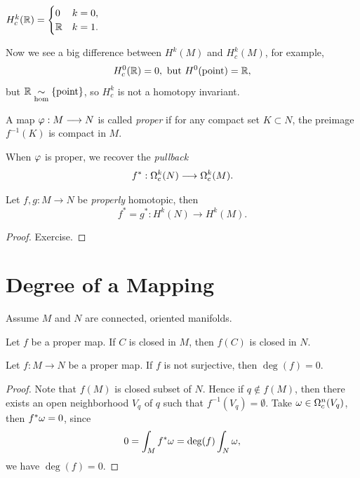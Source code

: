 \begin{example}
    \(H_c^k(\mathbb{R}) = \begin{cases}
        0 & k = 0, \\
        \mathbb{R} & k = 1.
    \end{cases}\)
\end{example}

Now we see a big difference between \(H^k(M)\) and \(H_c^k(M)\), for example, \[
    H_c^0(\mathbb{R}) = 0, \text{ but } H^0({\text{point}}) = \mathbb{R},
\] but \(\mathbb{R}\underset{\mathrm{hom}}{\sim} \{\text{point}\}\), so \(H_c^k\) is not a homotopy invariant.

\begin{definition}
    A map \(\varphi:M\longrightarrow N\) is called \emph{proper} if for any compact set \(K\subset N\), the preimage \(f^{-1}(K)\) is compact in \(M\).
\end{definition}
When \(\varphi\) is proper, we recover the \emph{pullback} \[
    f^*:\Omega_c^k(N)\longrightarrow\Omega_c^k(M).
\]

\begin{theorem}
    Let \(f,g:M\longrightarrow N\) be \emph{properly} homotopic, then \[
        f^* = g^*:H^k(N)\longrightarrow H^k(M).
    \]
\end{theorem}
\begin{proof}
    Exercise.
\end{proof}

\begin{theorem}
    
\end{theorem}

\section{Degree of a Mapping}

Assume \(M\) and \(N\) are connected, oriented manifolds.

\begin{lemma}
    Let \(f\) be a proper map. If \(C\) is closed in \(M\), then \(f(C)\) is closed in \(N\).
\end{lemma}

\begin{proposition}
    Let \(f:M\longrightarrow N\) be a proper map. If \(f\) is not surjective, then \(\deg(f) = 0\).
\end{proposition}
\begin{proof}
    Note that \(f(M)\) is closed subset of \(N\). Hence if \(q\not\in f(M)\), then there exists an open neighborhood \(V_q\) of \(q\) such that \(f^{-1}(V_q) = \emptyset\).
    Take \(\omega\in\Omega_c^n(V_q)\), then \(f^*\omega = 0\), since \[
        0 = \int_M f^*\omega = \deg(f)\int_N\omega,
    \] we have \(\deg(f) = 0\).
\end{proof}

